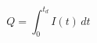 \documentclass[preview]{standalone}
\begin{document}
\[Q = \int_0^{t_d} I(t)\, dt \tag{3.1}\]
\end{document}
